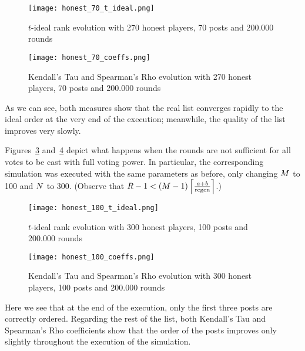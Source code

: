      \begin{figure}[!htbp]
        \texttt{[image: honest\_70\_t\_ideal.png]}
        \caption{$t$-ideal rank evolution with 270 honest players, 70 posts and
        200.000 rounds}
        \label{fig:honest:70:tideal}
      \end{figure}

      \begin{figure}[!htbp]
        \texttt{[image: honest\_70\_coeffs.png]}
        \caption{Kendall's Tau and Spearman's Rho evolution with 270 honest
        players, 70 posts and 200.000 rounds}
        \label{fig:honest:70:coeffs}
      \end{figure}

      As we can see, both measures show that the real list converges rapidly to
      the ideal order at the very end of the execution;  meanwhile, the
      quality of the list improves very slowly.

      Figures~\ref{fig:honest:100:tideal} and~\ref{fig:honest:100:coeffs} depict
      what happens when the rounds are not sufficient for all votes to be cast
      with full voting power. In particular, the corresponding simulation was
      executed with the same parameters as before, only changing $\postlen$ to
      100 and $\playerlen$ to 300. (Observe that $\rounds - 1 < \left(\postlen -
      1\right)\ceil*{\frac{a + b}{\regen}}$.)

      \begin{figure}[!htbp]
        \texttt{[image: honest\_100\_t\_ideal.png]}
        \caption{$t$-ideal rank evolution with 300 honest players, 100 posts and
        200.000 rounds}
        \label{fig:honest:100:tideal}
      \end{figure}

      \begin{figure}[!htbp]
        \texttt{[image: honest\_100\_coeffs.png]}
        \caption{Kendall's Tau and Spearman's Rho evolution with 300 honest
        players, 100 posts and 200.000 rounds}
        \label{fig:honest:100:coeffs}
      \end{figure}

      Here we see that at the end of the execution, only the first three posts
      are correctly ordered. Regarding the rest of the list, both Kendall's Tau
      and Spearman's Rho coefficients show that the order of the posts improves
      only slightly throughout the execution of the simulation.

